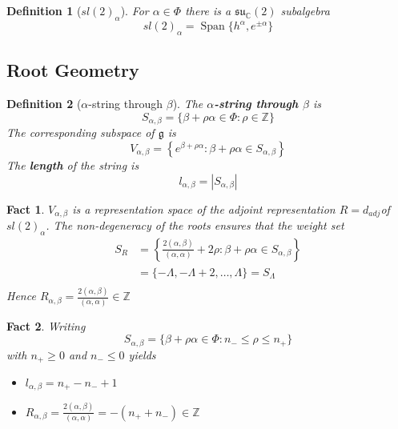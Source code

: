 \documentclass{article}
\newtheorem{definition}{Definition}[subsection]
\newtheorem{fact}{Fact}[subsection]
\DeclareMathOperator{\spn}{Span}
\newcommand{\bam}[1]{\textbf{#1}}
\newcommand{\mf}[1]{\mathfrak{#1}}
\newcommand{\mbb}[1]{\mathbb{#1}}
\begin{document}
\begin{definition}[$sl(2)_\alpha$]
For $\alpha\in\Phi$ there is a $\mf{su}_\mbb{C}(2)$ subalgebra 
\[
sl(2)_\alpha=\spn\lbrace h^\alpha, e^{\pm\alpha}\rbrace
\]
\end{definition}


\subsection{Root Geometry}

\begin{definition}[$\alpha$-string through $\beta$]
The \bam{$\alpha$-string through $\beta$} is 
\[
S_{\alpha, \beta}=\lbrace \beta+\rho\alpha\in\Phi : \rho\in\mbb{Z} \rbrace
\]
The corresponding subspace of $\mf{g}$ is 
\[
V_{\alpha, \beta}=\left\{ e^{\beta+\rho\alpha} : \beta+\rho\alpha\in S_{\alpha, \beta} \right\}
\]
The \bam{length} of the string is 
\[
l_{\alpha,\beta}=|S_{\alpha,\beta}|
\]
\end{definition}
\begin{fact}
$V_{\alpha, \beta}$ is a representation space of the adjoint representation $R=d_{adj}$of $sl(2)_\alpha$. The non-degeneracy of the roots ensures that the weight set 
\begin{align*}
    S_R &= \left\{ \frac{2(\alpha,\beta)}{(\alpha,\alpha)}+2\rho : \beta+\rho\alpha\in S_{\alpha, \beta} \right\} \\
     &= \lbrace -\Lambda,-\Lambda+2,\dots,\Lambda\rbrace=S_\Lambda \\
\end{align*}
Hence $R_{\alpha,\beta}=\frac{2(\alpha,\beta)}{(\alpha,\alpha)} \in\mbb{Z}$
\end{fact}

\begin{fact}
Writing
\[
S_{\alpha, \beta}=\lbrace \beta+\rho\alpha\in\Phi : n_- \leq \rho \leq n_+ \rbrace
\]
with $n_+ \geq 0$ and $n_- \leq 0$ yields
\begin{itemize}
    \item $l_{\alpha,\beta}=n_+-n_-+1$
    \item $R_{\alpha,\beta}=\frac{2(\alpha,\beta)}{(\alpha,\alpha)} = -(n_+ + n_-) \in\mbb{Z}$
\end{itemize}
\end{fact}
\end{document}
